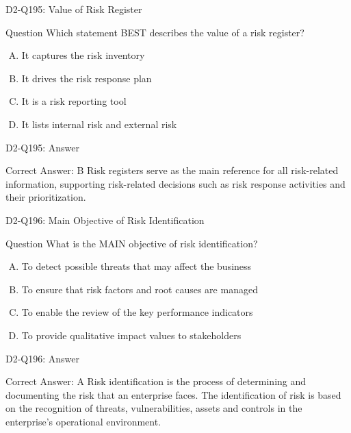 \documentclass{beamer}
\begin{document}
	\begin{frame}{D2-Q195: Value of Risk Register}
		\begin{block}{Question}
			Which statement BEST describes the value of a risk register?
		\end{block}
		\begin{enumerate}[(A)]
			\item It captures the risk inventory
			\item It drives the risk response plan
			\item It is a risk reporting tool
			\item It lists internal risk and external risk
		\end{enumerate}
	\end{frame}
	\begin{frame}{D2-Q195: Answer}
		\begin{block}{Correct Answer: B}
			Risk registers serve as the main reference for all risk-related information, supporting risk-related decisions such as risk response activities and their prioritization.
		\end{block}
	\end{frame}
	
	\begin{frame}{D2-Q196: Main Objective of Risk Identification}
		\begin{block}{Question}
			What is the MAIN objective of risk identification?
		\end{block}
		\begin{enumerate}[(A)]
			\item To detect possible threats that may affect the business
			\item To ensure that risk factors and root causes are managed
			\item To enable the review of the key performance indicators
			\item To provide qualitative impact values to stakeholders
		\end{enumerate}
	\end{frame}
	\begin{frame}{D2-Q196: Answer}
		\begin{block}{Correct Answer: A}
			Risk identification is the process of determining and documenting the risk that an enterprise faces. The identification of risk is based on the recognition of threats, vulnerabilities, assets and controls in the enterprise's operational environment.
		\end{block}
	\end{frame}
	
\end{document}
